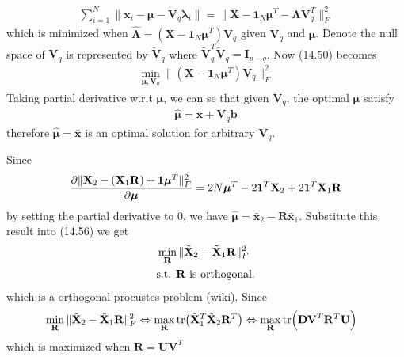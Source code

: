 \begin{exercise}
  \begin{align}
    \sum_{i=1}^N\|\mathbf{x}_i - \bm{\mu}-\mathbf{V}_q\bm{\lambda}_i\| =
    \|\mathbf{X} - \mathbf{1}_N\bm{\mu}^T - \mathbf{\Lambda}\mathbf{V}_q^T\|_F^2
  \end{align}
  which is minimized when $\hat{\mathbf{\Lambda}} = (\mathbf{X} -
  \mathbf{1}_N\bm{\mu}^T)\mathbf{V}_q$ given $\mathbf{V}_q$ and $\bm{\mu}$.
  Denote the null space of $\mathbf{V}_q$ is represented by
  $\tilde{\mathbf{V}}_q$ where $\tilde{\mathbf{V}}_q^T\tilde{\mathbf{V}}_q =
  \mathbf{I}_{p-q}$. Now (14.50) becomes
  \begin{align}
    \min_{\bm{\mu}, \mathbf{V}_q} \|(\mathbf{X} -
    \mathbf{1}_N\bm{\mu}^T)\tilde{\mathbf{V}}_q\|_F^2
  \end{align}
  Taking partial derivative w.r.t $\bm{\mu}$, we can se that given
  $\mathbf{V}_q$, the optimal $\bm{\mu}$ satisfy
  \begin{align}
    \hat{\bm{\mu}} = \bar{\mathbf{x}} + \mathbf{V}_q\mathbf{b}
  \end{align}
  therefore $\hat{\bm{\mu}} = \bar{\mathbf{x}}$ is an optimal solution for
  arbitrary $\mathbf{V}_q$.
\end{exercise}

\begin{exercise}
  Since
  \begin{align}
    \pdv{\|\mathbf{X}_2-(\mathbf{X}_1\mathbf{R})+\mathbf{1}\bm{\mu}^T\|_F^2}{\bm{\mu}}
    = 2N\bm{\mu}^T -2 \mathbf{1}^T\mathbf{X}_2
    +2\mathbf{1}^T\mathbf{X}_1\mathbf{R}
  \end{align}
  by setting the partial derivative to 0, we have $\hat{\bm{\mu}} =
  \bar{\mathbf{x}}_2-\mathbf{R}\bar{\mathbf{x}}_1$. Substitute this result into
  (14.56) we get
  \begin{align}
    & \min_{\mathbf{R}}\|\tilde{\mathbf{X}}_2 - \tilde{\mathbf{X}}_1\mathbf{R}\|_F^2
    \\
    & \mbox{s.t. } \mathbf{R} \mbox{ is orthogonal.}\notag
  \end{align}
  which is a orthogonal procustes problem (wiki). Since 
  \begin{align}
    & \min_{\mathbf{R}} \|\tilde{\mathbf{X}}_2 - \tilde{\mathbf{X}}_1\mathbf{R}\|_F^2
    \Leftrightarrow \max_{\mathbf{R}} 
    \tr(\tilde{\mathbf{X}}_1^T\tilde{\mathbf{X}}_2\mathbf{R}^T)
    \Leftrightarrow \max_{\mathbf{R}} 
    \tr(\mathbf{DV}^T\mathbf{R}^T\mathbf{U})
  \end{align}
  which is maximized when $\mathbf{R} = \mathbf{UV}^T$
\end{exercise}

